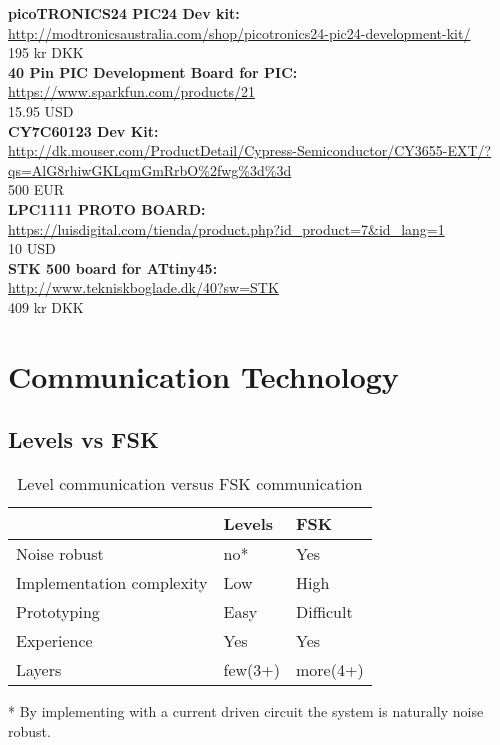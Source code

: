 \textbf{picoTRONICS24 PIC24 Dev kit:}\\
\url{http://modtronicsaustralia.com/shop/picotronics24-pic24-development-kit/}\\
195 kr DKK\\

\textbf{40 Pin PIC Development Board for PIC:}\\
\url{https://www.sparkfun.com/products/21}\\
15.95 USD\\

\textbf{CY7C60123 Dev Kit:}\\
\url{http://dk.mouser.com/ProductDetail/Cypress-Semiconductor/CY3655-EXT/?qs=AlG8rhiwGKLqmGmRrbO\%2fwg\%3d\%3d}\\
500 EUR\\

\textbf{LPC1111 PROTO BOARD:}\\
\url{https://luisdigital.com/tienda/product.php?id_product=7&id_lang=1}\\
10 USD\\

\textbf{STK 500 board for ATtiny45:}\\
\url{http://www.tekniskboglade.dk/40?sw=STK}\\
409 kr DKK\\

\chapter{Communication Technology}
\section{Levels vs FSK}
\begin{table}[H]
\centering
\begin{tabular}{l|l|l|}
~ 				& Levels 			& FSK \\\hline
Noise robust 	& no*				& Yes \\\hline
Implementation complexity & Low		& High \\\hline
Prototyping		& Easy				& Difficult \\\hline
Experience		& Yes				& Yes \\\hline
Layers			& few(3+)			& more(4+) \\\hline
\end{tabular}
\caption{Level communication versus FSK communication}
\label{tab:levelsvsfsk}
\end{table}
* By implementing with a current driven circuit the system is naturally noise robust.\\


